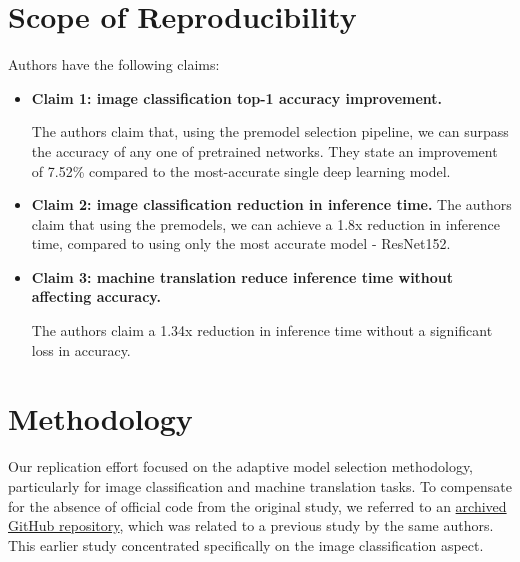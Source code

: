 \section{Scope of Reproducibility}
Authors have the following claims:
\begin{itemize}
	\item \textbf{Claim 1: image classification top-1 accuracy improvement.}
	      	      
	      The authors claim that, using the premodel selection pipeline, we can surpass the accuracy of any one of pretrained networks. They state an improvement of 7.52\% compared to the most-accurate single deep learning model.
	      	      
	\item \textbf{Claim 2: image classification reduction in inference time.}
	      The authors claim that using the premodels, we can achieve a 1.8x reduction in inference time, compared to using only the most accurate model - ResNet152.
	      	      
	\item \textbf{Claim 3: machine translation reduce inference time without affecting accuracy.}
	      	      
	      The authors claim a 1.34x reduction in inference time without a significant loss in accuracy.
	      	      
\end{itemize}


\section{Methodology}

Our replication effort focused on the adaptive model selection methodology, particularly for image classification and machine translation tasks. To compensate for the absence of official code from the original study, we referred to an \href{https://github.com/qwerybot/Adaptive_Deep_Learning}{archived GitHub repository}, which was related to a previous study\supercite{taylor2018adaptive} by the same authors. This earlier study concentrated specifically on the image classification aspect.

